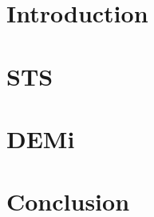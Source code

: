 

\begin{abstract}

\end{abstract}

\begin{frontmatter}

\tableofcontents



\end{frontmatter}

\chapter{Introduction}
\label{sec:intro}


\chapter{STS}
\label{sec:sts}


\chapter{DEMi}
\label{sec:demi}


\chapter{Conclusion}
\label{main_sec:conclusion}



%

%


\printbibliography


